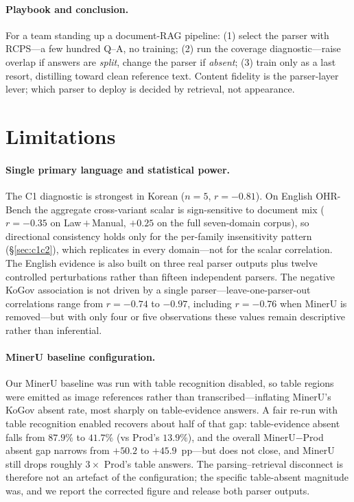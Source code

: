 \documentclass[11pt]{article}
\newcommand{\rcps}{\textsc{RCPS}}
\begin{document}
\paragraph{Playbook and conclusion.} For a team standing up a document-RAG pipeline: (1) select the parser with \rcps{}---a few hundred Q--A, no training; (2) run the coverage diagnostic---raise overlap if answers are \emph{split}, change the parser if \emph{absent}; (3) train only as a last resort, distilling toward clean reference text. Content fidelity is the parser-layer lever; which parser to deploy is decided by retrieval, not appearance.

\section*{Limitations}

\paragraph{Single primary language and statistical power.} The C1 diagnostic is strongest in Korean ($n = 5$, $r = -0.81$). On English OHR-Bench the aggregate cross-variant scalar is sign-sensitive to document mix ($r = -0.35$ on Law\,$+$\,Manual, $+0.25$ on the full seven-domain corpus), so directional consistency holds only for the per-family insensitivity pattern (\S\ref{sec:c1c2}), which replicates in every domain---not for the scalar correlation. The English evidence is also built on three real parser outputs plus twelve controlled perturbations rather than fifteen independent parsers. The negative KoGov association is not driven by a single parser---leave-one-parser-out correlations range from $r = -0.74$ to $-0.97$, including $r = -0.76$ when MinerU is removed---but with only four or five observations these values remain descriptive rather than inferential.

\paragraph{MinerU baseline configuration.} Our MinerU baseline was run with table recognition disabled, so table regions were emitted as image references rather than transcribed---inflating MinerU's KoGov absent rate, most sharply on table-evidence answers. A fair re-run with table recognition enabled recovers about half of that gap: table-evidence absent falls from $87.9\%$ to $41.7\%$ (vs Prod's $13.9\%$), and the overall MinerU$-$Prod absent gap narrows from $+50.2$ to $+45.9$~pp---but does not close, and MinerU still drops roughly $3\times$ Prod's table answers. The parsing--retrieval disconnect is therefore not an artefact of the configuration; the specific table-absent magnitude was, and we report the corrected figure and release both parser outputs.
\end{document}
